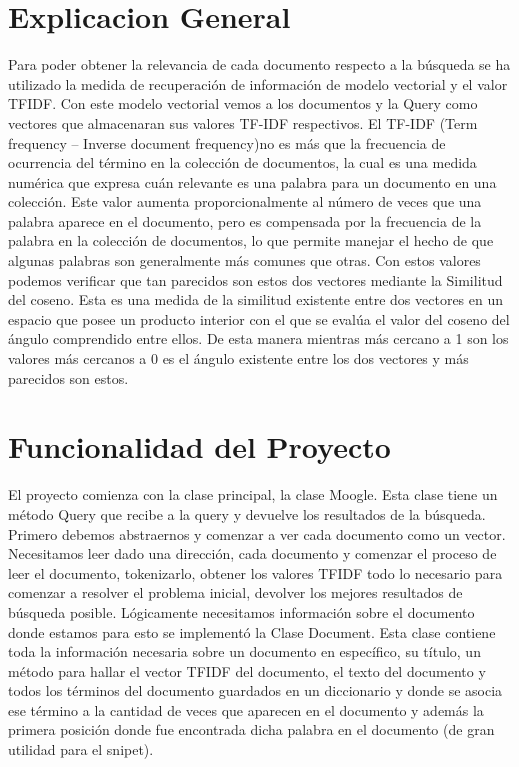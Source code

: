 \documentclass[a4paper,12pt]{article}
\begin{document}
\section{Explicacion General}\label{sec: General}

Para poder obtener la relevancia de cada documento respecto a la búsqueda se ha utilizado la medida de recuperación de información de modelo vectorial y el valor TFIDF. Con este modelo vectorial vemos a los documentos y la Query como vectores que almacenaran sus valores TF-IDF respectivos. El TF-IDF (Term frequency – Inverse document frequency)no es más que la frecuencia de ocurrencia del término en la colección de documentos, la cual es una medida numérica que expresa cuán relevante es una palabra para un documento en una colección. Este valor aumenta proporcionalmente al número de veces que una palabra aparece en el documento, pero es compensada por la frecuencia de la palabra en la colección de documentos, lo que permite manejar el hecho de que algunas palabras son generalmente más comunes que otras. Con estos valores podemos verificar que tan parecidos son estos dos vectores mediante la Similitud del coseno. Esta es una medida de la similitud existente entre dos vectores en un espacio que posee un producto interior con el que se evalúa el valor del coseno del ángulo comprendido entre ellos. De esta manera mientras más cercano a 1 son los valores más cercanos a 0 es el ángulo existente entre los dos vectores y más parecidos son estos.

\section{Funcionalidad del Proyecto}\label{sec:General}

El proyecto comienza con la clase principal, la clase Moogle. Esta clase tiene un método Query que recibe a la query y devuelve los resultados de la búsqueda.
Primero debemos abstraernos y comenzar a ver cada documento como un vector. Necesitamos leer dado una dirección, cada documento y comenzar el proceso de leer el documento, tokenizarlo, obtener los valores TFIDF todo lo necesario para comenzar a resolver el problema inicial, devolver los mejores resultados de búsqueda posible. Lógicamente necesitamos información sobre el documento donde estamos para esto se implementó la Clase Document. Esta clase contiene toda la información necesaria sobre un documento en específico, su título, un método para hallar el vector TFIDF del documento, el texto del documento y todos los términos del documento guardados en un diccionario y donde se asocia ese término a la cantidad de veces que aparecen en el documento y además la primera posición donde fue encontrada dicha palabra en el documento (de gran utilidad para el snipet).
\end{document}
